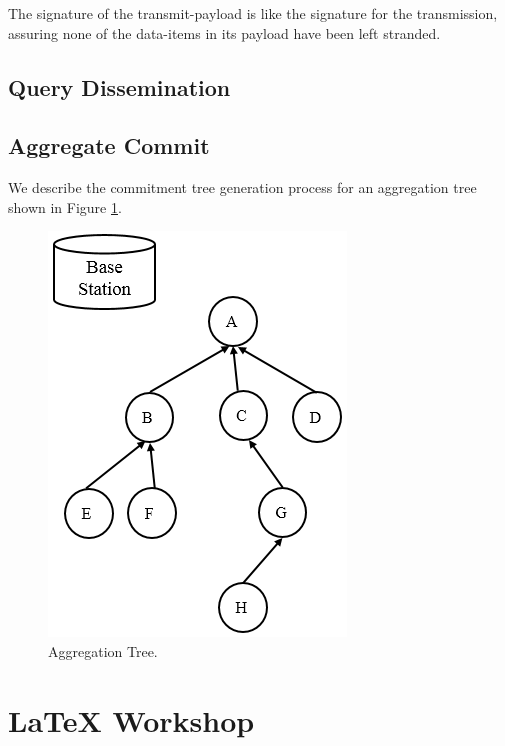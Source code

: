 \documentclass[%
  slidesonly,%
  semlayer%
  ]{seminar}                                  %
\begin{document}
\begin{slide}
      The signature of the transmit-payload is like the signature for the transmission, assuring none of the data-items in its payload have been left stranded.

      \clearpage

    \subsection*{Query Dissemination}
      \clearpage

    \subsection*{Aggregate Commit}
      We describe the commitment tree generation process for an aggregation tree shown in Figure \ref{fig:Aggregation-tree-1}.
      \begin{figure}[h!]
        \centering
        \includegraphics[scale=0.4]{images/aggregation-tree-1.png}
        \caption{Aggregation Tree.}
        \label{fig:Aggregation-tree-1}
      \end{figure}
      \clearpage

\clearpage

\section*{\LaTeX{ } Workshop}

\vspace{.75in}

\end{slide}
\end{document}
